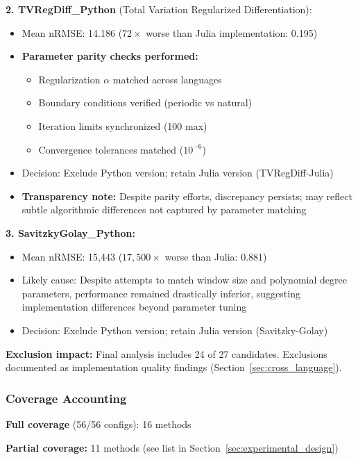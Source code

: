 \textbf{2. TVRegDiff\_Python} (Total Variation Regularized Differentiation):
\begin{itemize}
    \item Mean nRMSE: 14.186 ($72\times$ worse than Julia implementation: 0.195)
    \item \textbf{Parameter parity checks performed:}
    \begin{itemize}
        \item Regularization $\alpha$ matched across languages
        \item Boundary conditions verified (periodic vs natural)
        \item Iteration limits synchronized (100 max)
        \item Convergence tolerances matched ($10^{-6}$)
    \end{itemize}
    \item Decision: Exclude Python version; retain Julia version (TVRegDiff-Julia)
    \item \textbf{Transparency note:} Despite parity efforts, discrepancy persists; may reflect subtle algorithmic differences not captured by parameter matching
\end{itemize}

\textbf{3. SavitzkyGolay\_Python:}
\begin{itemize}
    \item Mean nRMSE: 15,443 ($17,500\times$ worse than Julia: 0.881)
    \item Likely cause: Despite attempts to match window size and polynomial degree parameters, performance remained drastically inferior, suggesting implementation differences beyond parameter tuning
    \item Decision: Exclude Python version; retain Julia version (Savitzky-Golay)
\end{itemize}

\textbf{Exclusion impact:} Final analysis includes 24 of 27 candidates. Exclusions documented as implementation quality findings (Section~\ref{sec:cross_language}).

\subsubsection{Coverage Accounting}

\textbf{Full coverage} (56/56 configs): 16 methods

\textbf{Partial coverage:} 11 methods (see list in Section~\ref{sec:experimental_design})

